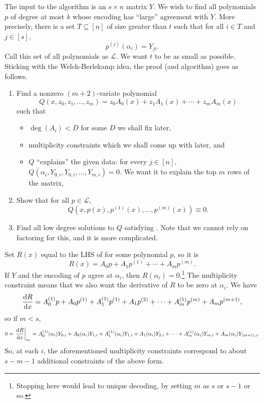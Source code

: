 		The input to the algorithm is an $s \times n$ matrix $Y$. We wish to find all polynomials $p$ of degree at most $k$ whose encoding has ``large'' agreement with $Y$. More precisely, there is a set $T \subseteq [n]$ of size greater than $t$ such that for all $i \in T$ and $j \in [s]$,
		\[ p^{(j)}(\alpha_{i}) = Y_{ji}. \]
		Call this set of all polynomials as $\mathcal{L}$.
		We want $t$ to be as small as possible.\\
		Sticking with the Welch-Berlekamp idea, the proof (and algorithm) goes as follows.
		\begin{enumerate}
			\item Find a nonzero $(m+2)$-variate polynomial
			\[ Q(x,z_0,z_1,\ldots,z_m) = z_0 A_0(x) + z_1 A_1(x) + \cdots + z_m A_m(x) \]
			such that
			\begin{itemize}
				\item $\deg(A_i) < D$ for some $D$ we shall fix later,
				\item multiplicity constraints which we shall come up with later, and
				\item $Q$ ``explains'' the given data: for every $j \in [n]$, $Q(\alpha_i,Y_{0,i},Y_{0,i},\ldots,Y_{m,i}) = 0$. We want it to explain the top $m$ rows of the matrix,
			\end{itemize}
			\item Show that for all $p \in \mathcal{L}$,
			\begin{equation}
				\label{eqn: guruswami-wang}
				Q(x,p(x),p^{(1)}(x),\ldots,p^{(m)}(x)) \equiv 0.
			\end{equation}
			\item Find all low degree solutions to $Q$ satisfying . Note that we cannot rely on factoring for this, and it is more complicated.
		\end{enumerate}

		Set $R(x)$ equal to the LHS of  for some polynomial $p$, so it is
		\[ R(x) = A_0p + A_1p^{(1)} + \cdots + A_m p^{(m)}. \]
		If $Y$ and the encoding of $p$ agree at $\alpha_i$, then $R(\alpha_i) = 0$.\footnote{Stopping here would lead to unique decoding, by setting $m$ as $s$ or $s-1$ or so.} The multiplicity constraint means that we also want the derivative of $R$ to be zero at $\alpha_i$. We have
		\[ \frac{\dif R}{\dif x} = A_0^{(1)}p + A_0p^{(1)} + A_1^{(1)}p^{(1)} + A_1p^{(2)} + \cdots + A_m^{(1)}p^{(m)} + A_mp^{(m+1)}, \]
		so if $m < s$,
		\[ 0 = \restr{\frac{\dif R}{\dif x}}{\alpha_i} = A_0^{(1)}(\alpha_i)Y_{0,i} + A_0(\alpha_i)Y_{1,i} + A_1^{(1)}(\alpha_i)Y_{1,i} + A_1(\alpha_i)Y_{2,i} + \cdots + A_m^{(1)}(\alpha_i)Y_{m,i} + A_m(\alpha_i) Y_{(m+1),i}. \]
		So, at each $i$, the aforementioned multiplicity constraints correspond to about $s-m-1$ additional constraints of the above form.\\

